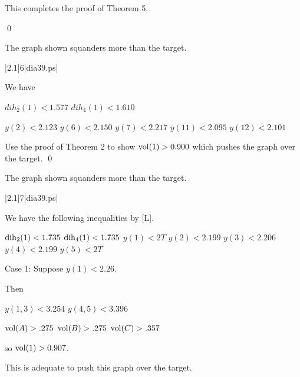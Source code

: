 This completes the proof of Theorem 5.

\qed

\bigskip



 The graph shown 
squanders more than the target.  \endproclaim

\gram|2.1|6|dia39.ps|  %

We have 

$dih_2(1) < 1.577$ \newline
$dih_4(1) < 1.610$ \newline

$y(2)<2.123$ \newline
$y(6)<2.150$ \newline
$y(7)<2.217$ \newline
$y(11)<2.095$ \newline
$y(12)<2.101$ \newline

Use the proof of Theorem 2 to show $\operatorname{vol}(1)>0.900$ which pushes the graph over the target. \qed

\bigskip

 The graph shown 
squanders more than the target.  \endproclaim

\gram|2.1|7|dia39.ps|  %


We have the following inequalities by [L].

$\operatorname{dih}_2(1) < 1.735$ \newline
$\operatorname{dih}_4(1) < 1.735$ \newline
$y(1)<2T$ \newline
$y(2)<2.199$ \newline
$y(3)<2.206$ \newline
$y(4)<2.199$ \newline
$y(5)<2T$ \newline


Case 1: Suppose $y(1)<2.26$.

Then 

$y(1,3)<3.254$ \newline
$y(4,5)<3.396$ \newline

$\operatorname{vol}(A)>.275$ \newline
$\operatorname{vol}(B)>.275$ \newline
$\operatorname{vol}(C)>.357$ \newline

so $\operatorname{vol}(1)>0.907$.  

This is adequate to push this graph over the target.


